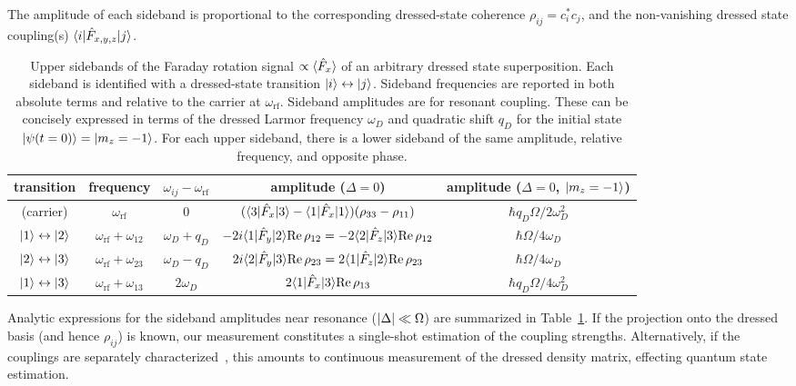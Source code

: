 \documentclass[aps,prl,reprint,superscriptaddress,floatfix]{revtex4-1}
\begin{document}
The amplitude of each sideband is proportional to the corresponding dressed-state coherence $\rho_{ij} = c_i^* c_j $, and the non-vanishing dressed state coupling(s) $\langle i \vert  \hat{F}_{x,y,z} \vert j \rangle $.
\begin{table*}[t]
    \caption{Upper sidebands of the Faraday rotation signal $\propto \langle \hat{F}_x \rangle$ of an arbitrary dressed state superposition.
    Each sideband is identified with a dressed-state transition $\vert i \rangle  \leftrightarrow \vert j \rangle $.
    Sideband frequencies are reported in both absolute terms and relative to the carrier at $\omega_{\text{rf}}$.
    Sideband amplitudes are for resonant coupling. 
    These can be concisely expressed in terms of the dressed Larmor frequency $\omega_D$ and quadratic shift $q_D$ for the initial state $\vert \psi(t=0) \rangle =\vert m_z=-1 \rangle $.
    For each upper sideband, there is a lower sideband of the same amplitude, relative frequency, and opposite phase.
    \label{tab:sidebands}
    }
    \begin{ruledtabular}
    \begin{tabular}{ccccc}
    transition & frequency & $\omega_{ij} - \omega_{\text{rf}}$ & amplitude ($\Delta = 0$) & amplitude ($\Delta = 0$, $\vert m_z=-1 \rangle $) \\ \hline
     (carrier) & $\omega_{\text{rf}}$ & 0 & $(\langle 3 \vert  \hat{F}_x \vert 3 \rangle  - \langle 1 \vert  \hat{F}_x \vert 1 \rangle ) (\rho_{33} - \rho_{11})$  & $\hbar q_D \Omega/2 \omega_D^2$ \\
     $\vert 1 \rangle  \leftrightarrow \vert 2 \rangle $ & $\omega_{\text{rf}} + \omega_{12}$ & $\omega_D+q_D$ & $-2i \langle 1 \vert  \hat{F}_y \vert 2 \rangle  \text{Re}\,\rho_{12} = -2 \langle 2 \vert  \hat{F}_z \vert 3 \rangle  \text{Re}\,\rho_{12}$ & $\hbar \Omega/4 \omega_D$ \\
     $\vert 2 \rangle  \leftrightarrow \vert 3 \rangle $ & $\omega_{\text{rf}} + \omega_{23}$ & $\omega_D-q_D$ & $2i \langle 2 \vert  \hat{F}_y \vert 3 \rangle  \text{Re}\,\rho_{23} = 2 \langle 1 \vert  \hat{F}_z \vert 2 \rangle  \text{Re}\,\rho_{23}$ & $\hbar \Omega/4 \omega_D$ \\
     $\vert 1 \rangle  \leftrightarrow \vert 3 \rangle $ & $\omega_{\text{rf}} + \omega_{13}$ & $2\omega_D$ & $2 \langle 1 \vert  \hat{F}_x \vert 3 \rangle  \text{Re}\,\rho_{13}$ & $\hbar q_D \Omega/4 \omega_D^2$
    \end{tabular}
    \end{ruledtabular}
\end{table*}
Analytic expressions for the sideband amplitudes near resonance ($\vert \Delta \vert  \ll \Omega$) are summarized in Table~\ref{tab:sidebands}.
If the projection onto the dressed basis (and hence $\rho_{ij}$) is known, our measurement constitutes a single-shot estimation of the coupling strengths.  
Alternatively, if the couplings are separately characterized~\cite{trypogeorgos_synthetic_2017}, this amounts to continuous measurement of the dressed density matrix, effecting quantum state estimation.
\end{document}
